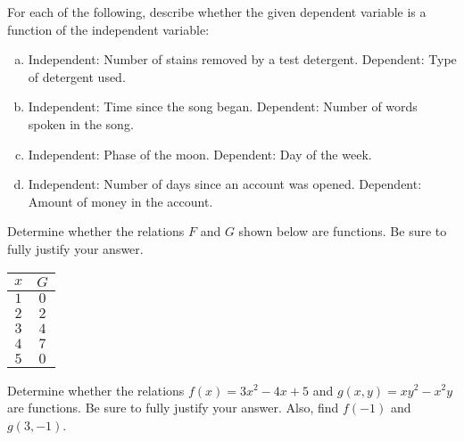 \documentclass[11pt,letterpaper]{article}
\begin{document}

 For each of the following, describe whether the given dependent variable is a function of the independent variable:
	\begin{enumerate}[(a)]
	\item Independent: Number of stains removed by a test detergent. 
		Dependent: Type of detergent used. 
	\item Independent: Time since the song began.
		Dependent: Number of words spoken in the song. 
	\item Independent: Phase of the moon.
		Dependent: Day of the week. 
	\item Independent: Number of days since an account was opened. 
		Dependent: Amount of money in the account. 
	\end{enumerate}



\newpage



 Determine whether the relations $F$ and $G$ shown below are functions. Be sure to fully justify your answer. \pspace
	\hfill
	\begin{minipage}[c]{0.48\textwidth}
	\end{minipage}%
	\begin{minipage}[c]{0.40\textwidth}
	\begin{table}[H]
	\centering
	\begin{tabular}{cc}
	$x$ & $G$ \\ \hline
	$1$ & $0$ \\
	$2$ & $2$ \\
	$3$ & $4$ \\
	$4$ & $7$ \\
	$5$ & $0$
	\end{tabular}
	\end{table}
	\end{minipage} 



\newpage



 Determine whether the relations $f(x)= 3x^2 - 4x + 5$ and $g(x, y)= xy^2 - x^2y$ are functions. Be sure to fully justify your answer. Also, find $f(-1)$ and $g(3, -1)$. 
\end{document}
